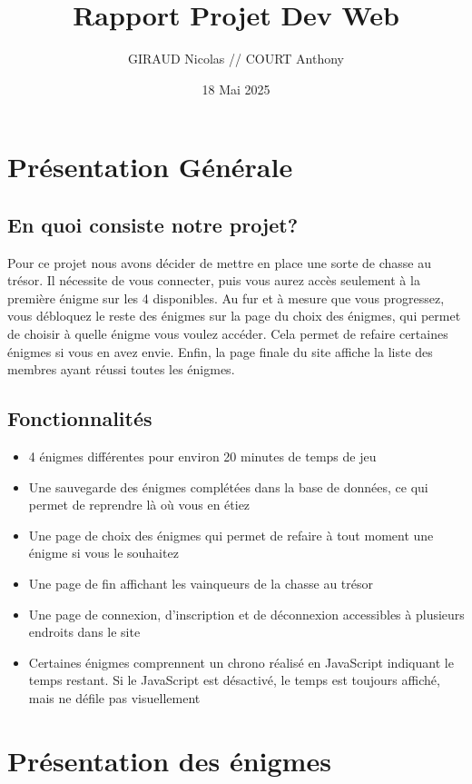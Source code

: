 \documentclass[12pt,a4paper]{article}
\title{Rapport Projet Dev Web} %
\author{GIRAUD Nicolas // COURT Anthony} %
\date{18 Mai 2025} %
\begin{document}
\maketitle
\newpage

\tableofcontents
\newpage

\section{Présentation Générale}
\subsection{En quoi consiste notre projet?}
Pour ce projet nous avons décider de mettre en place une sorte de chasse au trésor. Il nécessite de vous connecter, puis vous aurez accès seulement à la première énigme sur les 4 disponibles. Au fur et à mesure que vous progressez, vous débloquez le reste des énigmes sur la page du choix des énigmes, qui permet de choisir à quelle énigme vous voulez accéder. Cela permet de refaire certaines énigmes si vous en avez envie. Enfin, la page finale du site affiche la liste des membres ayant réussi toutes les énigmes. \\

\subsection{Fonctionnalités}

\begin{itemize}
\item 4 énigmes différentes pour environ 20 minutes de temps de jeu
\item Une sauvegarde des énigmes complétées dans la base de données, ce qui permet de reprendre là où vous en étiez
\item Une page de choix des énigmes qui permet de refaire à tout moment une énigme si vous le souhaitez
\item Une page de fin affichant les vainqueurs de la chasse au trésor
\item Une page de connexion, d'inscription et de déconnexion accessibles à plusieurs endroits dans le site
\item Certaines énigmes comprennent un chrono réalisé en JavaScript indiquant le temps restant. Si le JavaScript est désactivé, le temps est toujours affiché, mais ne défile pas visuellement
\end{itemize}
\newpage

\section{Présentation des énigmes}
\end{document}
